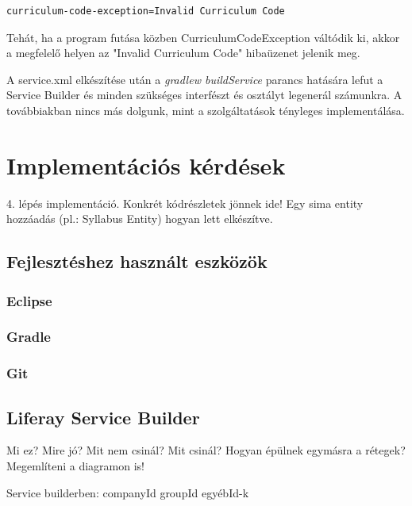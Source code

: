 \documentclass[hidelinks, 12pt, a4paper]{report}
\begin{document}
\begin{minipage}{\linewidth}
\begin{lstlisting}
curriculum-code-exception=Invalid Curriculum Code
\end{lstlisting}
\end{minipage}

Tehát, ha a program futása közben CurriculumCodeException váltódik ki, akkor a megfelelő helyen az "Invalid Curriculum Code" hibaüzenet jelenik meg.

A service.xml elkészítése után a \emph{gradlew buildService} parancs hatására lefut a Service Builder és minden szükséges interfészt és osztályt legenerál számunkra. A továbbiakban nincs más dolgunk, mint a szolgáltatások tényleges implementálása.

\section{Implementációs kérdések}

4. lépés implementáció. Konkrét kódrészletek jönnek ide! Egy sima entity hozzáadás (pl.: Syllabus Entity) hogyan lett elkészítve.

\subsection{Fejlesztéshez használt eszközök}

\subsubsection{Eclipse}

\subsubsection{Gradle}

\subsubsection{Git}

\subsection{Liferay Service Builder}

Mi ez? Mire jó? Mit nem csinál? Mit csinál?
Hogyan épülnek egymásra a rétegek? Megemlíteni a diagramon is!

Service builderben:
companyId
groupId
egyébId-k
\end{document}
